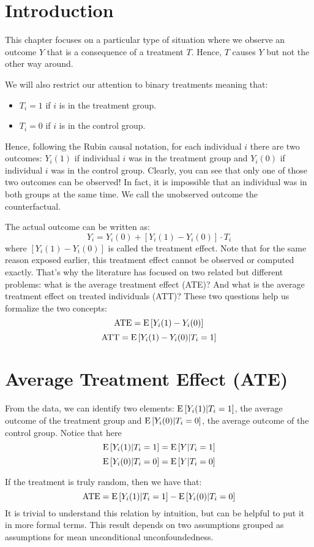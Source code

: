 \section{Introduction}

This chapter focuses on a particular type of situation where we observe an outcome $Y$ that is a consequence of a treatment $T$. Hence, $T$ causes $Y$ but not the other way around.

We will also restrict our attention to binary treatments meaning that:\begin{itemize}
\item $T_i = 1$ if $i$ is in the treatment group.
\item $T_i = 0$ if $i$ is in the control group.
\end{itemize}
Hence, following the Rubin causal notation, for each individual $i$ there are two outcomes: $Y_i(1)$ if individual $i$ was in the treatment group and $Y_i(0)$ if individual $i$ was in the control group. Clearly, you can see that only one of those two outcomes can be observed! In fact, it is impossible that an individual was in both groups at the same time. We call the unobserved outcome the counterfactual.

The actual outcome can be written as: $$Y_i = Y_i(0) + [Y_i(1) - Y_i(0)]\cdot T_i $$ where $[Y_i(1) - Y_i(0)]$ is called the treatment effect. Note that for the same reason exposed earlier, this treatment effect cannot be observed or computed exactly. That's why the literature has focused on two related but different problems: what is the average treatment effect (ATE)? And what is the average treatment effect on treated individuals (ATT)? These two questions help us formalize the two concepts: $$\operatorname{ATE} = \operatorname{E}\left[Y_i(1) - Y_i(0)\right] $$ $$\operatorname{ATT} = \operatorname{E}\left[Y_i(1) - Y_i(0)\vert T_i=1\right] $$

\section{Average Treatment Effect (ATE)}

From the data, we can identify two elements: $\operatorname{E}\left[Y_i(1)\vert T_i=1\right]$, the average outcome of the treatment group and $\operatorname{E}\left[Y_i(0)\vert T_i=0\right]$, the average outcome of the control group. Notice that here $$ \operatorname{E}\left[Y_i(1)\vert T_i=1\right] = \operatorname{E}\left[Y\vert T_i=1\right] $$ $$\operatorname{E}\left[Y_i(0)\vert T_i=0\right] = \operatorname{E}\left[Y\vert T_i=0\right] $$

If the treatment is truly random, then we have that: $$\operatorname{ATE} = \operatorname{E}\left[Y_i(1)\vert T_i=1\right] - \operatorname{E}\left[Y_i(0)\vert T_i=0\right] $$ It is trivial to understand this relation by intuition, but can be helpful to put it in more formal terms. This result depends on two assumptions grouped as assumptions for mean unconditional unconfoundedness.

